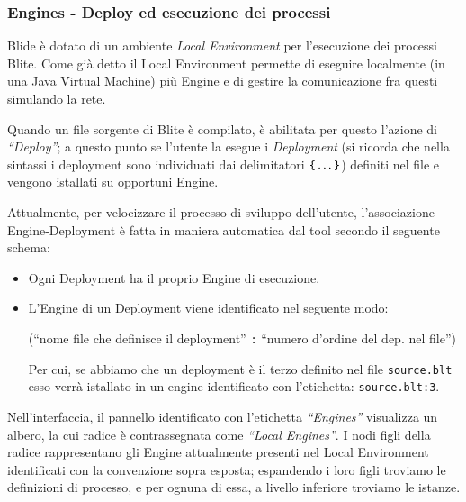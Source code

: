 \newpage

\subsubsection*{Engines - Deploy ed esecuzione dei processi}

Blide è dotato di un ambiente \emph{Local Environment} per l'esecuzione dei
processi Blite. Come già detto il Local Environment permette di eseguire
localmente (in una Java Virtual Machine) più Engine e di gestire la
comunicazione fra questi simulando la rete.

Quando un file sorgente di Blite è compilato, è abilitata per questo l'azione
di \emph{``Deploy''}; a questo punto se l'utente la esegue i \emph{Deployment}
(si ricorda che nella sintassi i deployment sono individuati dai delimitatori
$\verb#{# \ldots \verb#}#$) definiti nel file e vengono istallati su
opportuni Engine.

Attualmente, per velocizzare il processo di sviluppo dell'utente, l'associazione
Engine-Deployment è fatta in maniera automatica dal tool secondo il seguente
schema:

\begin{itemize}
  \item Ogni Deployment ha il proprio Engine di esecuzione.
  \item L'Engine di un Deployment viene identificato nel seguente modo: 
  
  (``nome file che definisce il deployment'' \texttt{:} ``numero d'ordine del
  dep. nel file'')
  
  Per cui, se abbiamo che un deployment è il terzo definito nel file
  \texttt{source.blt} esso verrà istallato in un engine identificato con
  l'etichetta: \texttt{source.blt:3}.
\end{itemize}

Nell'interfaccia, il pannello identificato con l'etichetta \emph{``Engines''}
visualizza un albero, la cui radice è contrassegnata come \emph{``Local
Engines''}. I nodi figli della radice rappresentano gli Engine attualmente
presenti nel Local Environment identificati con la convenzione sopra esposta;
espandendo i loro figli troviamo le definizioni di processo, e per ognuna di
essa, a livello inferiore troviamo le istanze.

